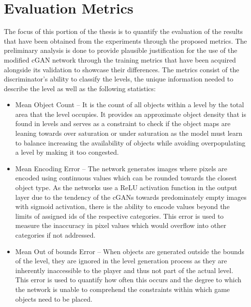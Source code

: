 \documentclass{Configuration_Files/PoliMi3i_thesis}
\begin{document}
\section{Evaluation Metrics}
The focus of this portion of the thesis is to quantify the evaluation of the results that 
have been obtained from the experiments through the proposed metrics. The
preliminary analysis is done to provide plausible justification for the use of the 
modified cGAN network through the training metrics that have been acquired 
alongside its validation to showcase their differences. The metrics consist of the 
discriminator’s ability to classify the levels, the unique information needed to 
describe the level as well as the following statistics:
\begin{itemize}
\item Mean Object Count – It is the count of all objects within a level by the total 
area that the level occupies. It provides an approximate object density that is 
found in levels and serves as a constraint to check if the object maps are 
leaning towards over saturation or under saturation as the model must learn 
to balance increasing the availability of objects while avoiding overpopulating
a level by making it too congested.
\item Mean Encoding Error – The network generates images where pixels are encoded 
using continuous values which can be rounded towards the closest object type. As the 
networks use a ReLU activation function in the output layer due to the tendency of the 
cGANs towards predominately empty images with sigmoid activation, there is the ability 
to encode values  beyond the limits of assigned ids of the respective categories. This 
error is used to measure the inaccuracy in pixel values which would overflow into other 
categories if not addressed.
\item Mean Out of bounds Error – When objects are generated outside the bounds 
of the level, they are ignored in the level generation process as they are 
inherently inaccessible to the player and thus not part of the actual level. This 
error is used to quantify how often this occurs and the degree to which the 
network is unable to comprehend the constraints within which game objects 
need to be placed.
\end{itemize}
\newpage
\end{document}
